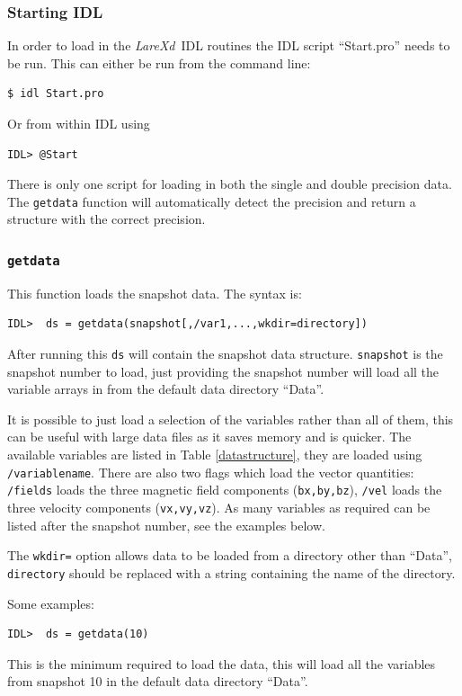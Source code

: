 \documentclass[11pt]{article}
\newcommand{\lare}{{\it LareXd}\ }
\begin{document}
\subsubsection{Starting IDL}
In order to load in the \lare IDL routines the IDL script ``Start.pro'' needs to be run. This can either be run from the command line:
\begin{verbatim}
$ idl Start.pro
\end{verbatim}
Or from within IDL using
\begin{verbatim}
IDL> @Start
\end{verbatim}

There is only one script for loading in both the single and double precision data. The \texttt{getdata} function will automatically detect the precision and return a structure with the correct precision.

\subsubsection{\texttt{getdata}}
This function loads the snapshot data. The syntax is:
\begin{verbatim}
IDL>  ds = getdata(snapshot[,/var1,...,wkdir=directory])
\end{verbatim}

After running this \texttt{ds} will contain the snapshot data structure. \texttt{snapshot} is the snapshot number to load, just providing the snapshot number will load all the variable arrays in from the default data directory ``Data''.

It is possible to just load a selection of the variables rather than all of them, this can be useful with large data files as it saves memory and is quicker. The available variables are listed in Table \ref{datastructure}, they are loaded using \texttt{/variablename}. There are also two flags which load the vector quantities: \texttt{/fields} loads the three magnetic field components (\texttt{bx,by,bz}), \texttt{/vel} loads the three velocity components (\texttt{vx,vy,vz}). As many variables as required can be listed after the snapshot number, see the examples below.

The \texttt{wkdir=} option allows data to be loaded from a directory other than ``Data'', \texttt{directory} should be replaced with a string containing the name of the directory.

Some examples:
\begin{verbatim}
IDL>  ds = getdata(10)
\end{verbatim}
This is the minimum required to load the data, this will load all the variables from snapshot 10 in the default data directory ``Data''.
\end{document}
